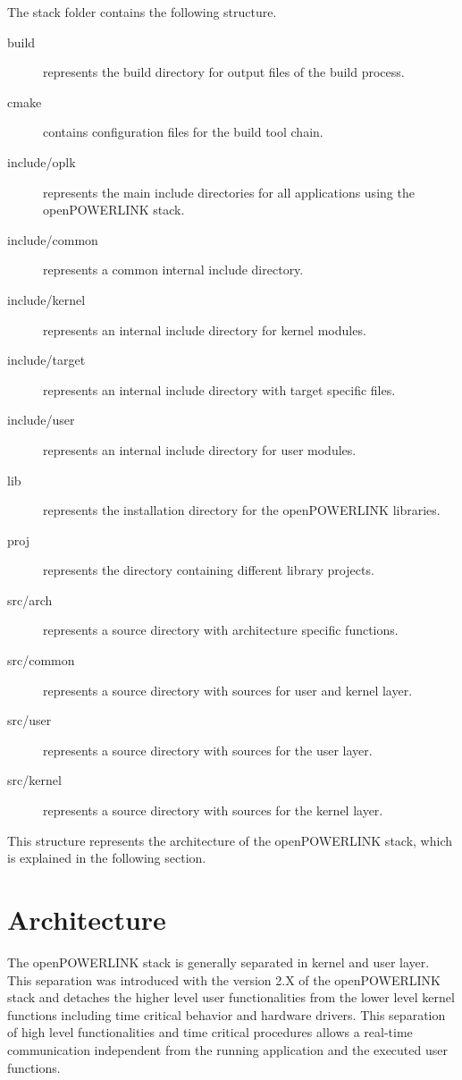 The stack folder contains the following structure. \cite[Directory Structure]{openpowerlink_doc}
\begin{description}
    \item[build] represents the build directory for output files of the build process.
    \item[cmake] contains configuration files for the build tool chain.
    \item[include/oplk] represents the main include directories for all applications using the openPOWERLINK stack.
    \item[include/common] represents a common internal include directory.
    \item[include/kernel] represents an internal include directory for kernel modules.
    \item[include/target] represents an internal include directory with target specific files.
    \item[include/user] represents an internal include directory for user modules.
    \item[lib] represents the installation directory for the openPOWERLINK libraries.
    \item[proj] represents the directory containing different library projects.
    \item[src/arch] represents a source directory with architecture specific functions.
    \item[src/common] represents a source directory with sources for user and kernel layer.
    \item[src/user] represents a source directory with sources for the user layer.
    \item[src/kernel] represents a source directory with sources for the kernel layer.
\end{description}

This structure represents the architecture of the openPOWERLINK stack, which is explained in the following section.

\section{Architecture}
\label{sec:oplk_architecture}
\begin{sloppypar}
The openPOWERLINK stack is generally separated in kernel and user layer.
This separation was introduced with the version 2.X of the openPOWERLINK stack and detaches the higher level user functionalities from the lower level kernel functions including time critical behavior and hardware drivers.
This separation of high level functionalities and time critical procedures allows a real-time communication independent from the running application and the executed user functions.
\end{sloppypar}

